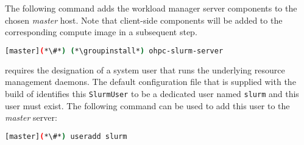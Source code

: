 The following command adds the \SLURM{} workload manager server components to the
chosen {\em master} host. Note that client-side components will be added to
the corresponding compute image in a subsequent step.

\begin{lstlisting}[language=bash,keywords={}]
[master](*\#*) (*\groupinstall*) ohpc-slurm-server
\end{lstlisting}

\SLURM{} requires the designation of a system user that runs the underlying
resource management daemons. The default configuration file that is supplied
with the \OHPC{} build of \SLURM{} identifies this \texttt{SlurmUser} to be a
dedicated user named \texttt{slurm} and this user must exist. 
The following command can be used to add this user to the {\em
  master} server:

\begin{lstlisting}[language=bash,keywords={}]
[master](*\#*) useradd slurm
\end{lstlisting}


